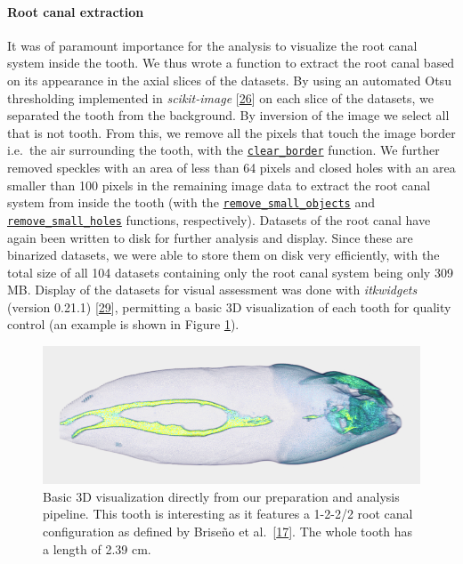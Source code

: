 \documentclass[
  american,
]{article}
\begin{document}
\hypertarget{root-canal-extraction}{%
\paragraph{Root canal extraction}\label{root-canal-extraction}}

It was of paramount importance for the analysis to visualize the root canal system inside the tooth.
We thus wrote a function to extract the root canal based on its appearance in the axial slices of the datasets.
By using an automated Otsu thresholding implemented in \emph{scikit-image} {[}\protect\hyperlink{ref-stvWEJeu}{26}{]} on each slice of the datasets, we separated the tooth from the background.
By inversion of the image we select all that is not tooth.
From this, we remove all the pixels that touch the image border i.e.~the air surrounding the tooth, with the \href{https://scikit-image.org/docs/dev/api/skimage.segmentation.html\#skimage.segmentation.clear_border}{\texttt{clear\_border}} function.
We further removed speckles with an area of less than 64 pixels and closed holes with an area smaller than 100 pixels in the remaining image data to extract the root canal system from inside the tooth (with the \href{https://scikit-image.org/docs/dev/api/skimage.morphology.html\#skimage.morphology.remove_small_objects}{\texttt{remove\_small\_objects}} and
\href{https://scikit-image.org/docs/dev/api/skimage.morphology.html\#skimage.morphology.remove_small_holes}{\texttt{remove\_small\_holes}} functions, respectively).
Datasets of the root canal have again been written to disk for further analysis and display.
Since these are binarized datasets, we were able to store them on disk very efficiently, with the total size of all 104 datasets containing only the root canal system being only 309 MB.
Display of the datasets for visual assessment was done with \emph{itkwidgets} (version 0.21.1) {[}\protect\hyperlink{ref-v85zR2Z2}{29}{]}, permitting a basic 3D visualization of each tooth for quality control (an example is shown in Figure \ref{fig:3ditkwidgets}).

\begin{figure}
\hypertarget{fig:3ditkwidgets}{%
\centering
\includegraphics{images/Tooth045.itkwidgets.png}
\caption{Basic 3D visualization directly from our preparation and analysis pipeline.
This tooth is interesting as it features a 1-2-2/2 root canal configuration as defined by Briseño et al.~{[}\protect\hyperlink{ref-ZTgDEakx}{17}{]}.
The whole tooth has a length of 2.39 cm.}\label{fig:3ditkwidgets}
}
\end{figure}
\end{document}
